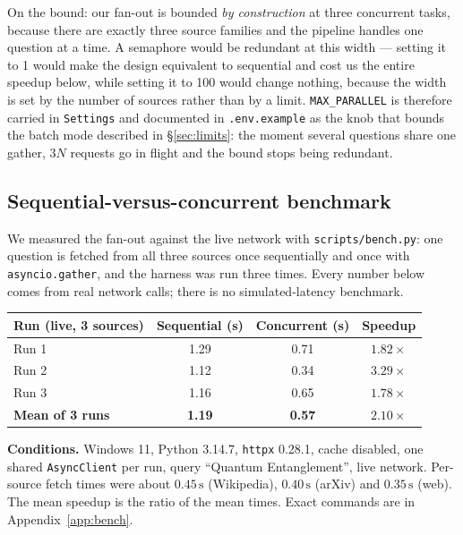 \documentclass[11pt,a4paper]{article}
\begin{document}
On the bound: our fan-out is bounded \emph{by construction} at three concurrent tasks, because
there are exactly three source families and the pipeline handles one question at a time. A
semaphore would be redundant at this width --- setting it to 1 would make the design equivalent
to sequential and cost us the entire speedup below, while setting it to 100 would change nothing,
because the width is set by the number of sources rather than by a limit. \texttt{MAX\_PARALLEL}
is therefore carried in \texttt{Settings} and documented in \texttt{.env.example} as the knob that
bounds the batch mode described in \S\ref{sec:limits}: the moment several questions share one
gather, $3N$ requests go in flight and the bound stops being redundant.

\subsection{Sequential-versus-concurrent benchmark}

We measured the fan-out against the live network with \texttt{scripts/bench.py}: one question
is fetched from all three sources once sequentially and once with \texttt{asyncio.gather}, and the
harness was run three times. Every number below comes from real network calls; there is no
simulated-latency benchmark.

\vspace{0.4em}
\begin{center}\small
\begin{tabular}{lccc}
\toprule
\textbf{Run (live, 3 sources)} & \textbf{Sequential (s)} & \textbf{Concurrent (s)} & \textbf{Speedup} \\
\midrule
Run 1 & 1.29 & 0.71 & $1.82\times$ \\
Run 2 & 1.12 & 0.34 & $3.29\times$ \\
Run 3 & 1.16 & 0.65 & $1.78\times$ \\
\midrule
\textbf{Mean of 3 runs} & \textbf{1.19} & \textbf{0.57} & $\mathbf{2.10\times}$ \\
\bottomrule
\end{tabular}
\end{center}
\vspace{0.4em}

\noindent\textbf{Conditions.} Windows 11, Python 3.14.7, \texttt{httpx} 0.28.1, cache disabled,
one shared \texttt{AsyncClient} per run, query ``Quantum Entanglement'', live network. Per-source
fetch times were about $0.45\,\mathrm{s}$ (Wikipedia), $0.40\,\mathrm{s}$ (arXiv) and
$0.35\,\mathrm{s}$ (web). The mean speedup is the ratio of the mean times. Exact commands are in
Appendix~\ref{app:bench}.
\end{document}
